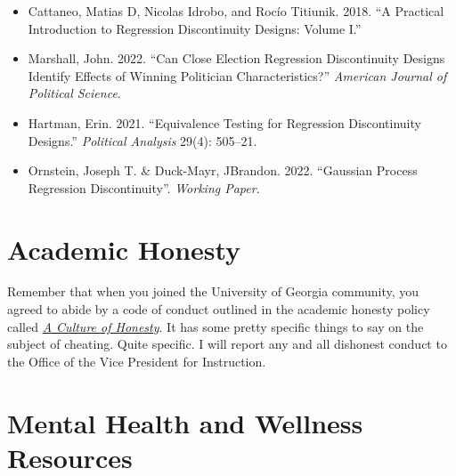 \documentclass[11pt, letterpaper]{article}
\begin{document}
\begin{itemize}
	
	\item Cattaneo, Matias D, Nicolas Idrobo, and Rocío Titiunik. 2018. ``A Practical Introduction to Regression Discontinuity Designs: Volume I.''
	\item Marshall, John. 2022. ``Can Close Election Regression Discontinuity Designs Identify Effects of Winning Politician Characteristics?'' \textit{American Journal of Political Science}.
	\item Hartman, Erin. 2021. ``Equivalence Testing for Regression Discontinuity Designs.'' \textit{Political Analysis} 29(4): 505–21.
	\item Ornstein, Joseph T. \& Duck-Mayr, JBrandon. 2022. ``Gaussian Process Regression Discontinuity''. \textit{Working Paper}.
\end{itemize}

%


\section*{Academic Honesty}

Remember that when you joined the University of Georgia community, you agreed to abide by a code of conduct outlined in the academic honesty policy called \href{https://honesty.uga.edu/Academic-Honesty-Policy/Introduction/}{\textit{A Culture of Honesty}}. It has some pretty specific things to say on the subject of cheating. Quite specific. I will report any and all dishonest conduct to the Office of the Vice President for Instruction.

\section*{Mental Health and Wellness Resources}
\end{document}
